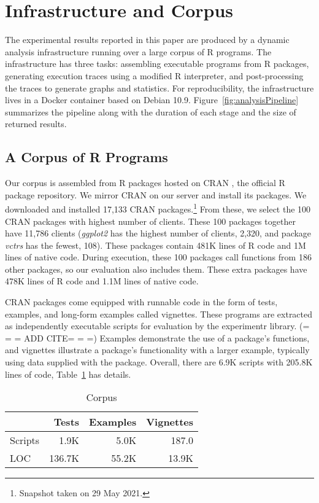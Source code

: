 \documentclass[10pt,review,sigplan,authorversion=true]{acmart}
\newcommand{\experimentr}{{\sf experimentr}\xspace}
\newcommand{\ggplot}{\textit{ggplot2}\xspace}
\newcommand{\vctrs}{\textit{vctrs}\xspace}
\begin{document}
\section{Infrastructure and Corpus}

The experimental results reported in this paper are produced by a dynamic
analysis infrastructure running over a large corpus of R programs. The
infrastructure has three tasks: assembling executable programs from R packages,
generating execution traces using a modified R interpreter, and post-processing
the traces to generate graphs and statistics. For reproducibility, the
infrastructure lives in a Docker container based on Debian 10.9.
Figure~\ref{fig:analysisPipeline} summarizes the pipeline along with the
duration of each stage and the size of returned results.

\subsection{A Corpus of R Programs}

Our corpus is assembled from R packages hosted on CRAN \cite{ligges2017}, the
official R package repository. We mirror CRAN on our server and install its
packages. We downloaded and installed 17,133 CRAN packages.\footnote{Snapshot
taken on 29 May 2021.} From these, we select the 100 CRAN packages with highest
number of clients. These 100 packages together have 11,786 clients (\ggplot has
the highest number of clients, 2,320, and package \vctrs has the fewest, 108).
These packages contain 481K lines of R code and 1M lines of native code. During
execution, these 100 packages call functions from 186 other packages, so our
evaluation also includes them. These extra packages have 478K lines of R code
and 1.1M lines of native code.

CRAN packages come equipped with runnable code in the form of tests, examples,
and long-form examples called vignettes. These programs are extracted as
independently executable scripts for evaluation by the \experimentr library. (=
= = ADD CITE= = =) Examples demonstrate the use of a package's functions, and
vignettes illustrate a package's functionality with a larger example, typically
using data supplied with the package. Overall, there are 6.9K scripts with
205.8K lines of code, Table~\ref{table:corpus} has details.

\begin{table}[!h]  \vspace{-3mm}  \small  \centering
  \caption{Corpus}\label{table:corpus}
  \vspace{-3mm}
  \begin{tabular}{lrrr}    \toprule
    &\bf Tests&\bf Examples&\bf Vignettes\\    \midrule
    {Scripts}&1.9K&5.0K&187.0\\    \midrule
    {LOC}&136.7K&55.2K&13.9K\\
    \bottomrule
  \end{tabular}
\end{table}
\end{document}
